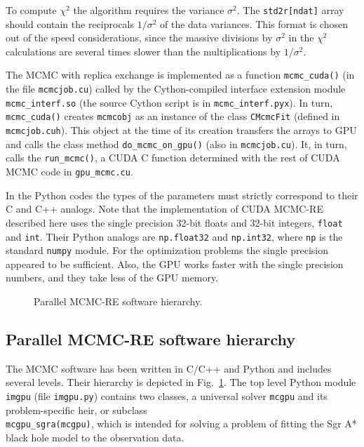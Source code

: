 \documentclass[preprint2]{aastex}
\begin{document}
To compute $\chi^2$ the algorithm requires the variance ${\sigma^2}$.
The \verb|std2r[ndat]| array should contain the reciprocals $1/\sigma^2$ 
of the data variances. This format is chosen out of the speed considerations,
since the massive divisions by $\sigma^2$ in the $\chi^2$ calculations are 
several times slower than the multiplications by $1/\sigma^2$. 

The MCMC with replica exchange is implemented as a function \verb|mcmc_cuda()|
(in the file \verb|mcmcjob.cu|) called by the Cython-compiled interface extension 
module \verb|mcmc_interf.so| (the source Cython script is in \verb|mcmc_interf.pyx|).
In turn, \verb|mcmc_cuda()| creates \verb|mcmcobj| as an instance of the class 
\verb|CMcmcFit| (defined in \verb|mcmcjob.cuh|). This object at the time of its creation
transfers the arrays to GPU and calls the class method \verb|do_mcmc_on_gpu()|
(also in \verb|mcmcjob.cu|). It, in turn, calls the \verb|run_mcmc()|, a CUDA C 
function determined with the rest of CUDA MCMC code in \verb|gpu_mcmc.cu|. 

In the Python codes the types of the parameters must strictly correspond to 
their  C and C++ analogs. Note that the implementation of CUDA MCMC-RE described
here uses the single precision 32-bit floats and 32-bit integers, \verb|float| 
and \verb|int|. Their Python analogs are \verb|np.float32| and \verb|np.int32|, 
where \verb|np| is the standard \verb|numpy| module. For the optimization problems 
the single precision appeared to be sufficient. Also, the GPU works faster with the 
single precision numbers, and they take less of the GPU memory.


\begin{figure}[ht!]    %
\caption{\small Parallel MCMC-RE software hierarchy.
\label{mcmc_soft_hierarchy}}
\end{figure}




\subsection{Parallel MCMC-RE software hierarchy}

The MCMC software has been written in C/C++ and Python and includes several levels. Their hierarchy is depicted in Fig.~\ref{mcmc_soft_hierarchy}. The top level Python module \verb|imgpu| (file \verb|imgpu.py|) contains two classes, a universal solver \verb|mcgpu| and its problem-specific heir, or subclass \\
\verb|mcgpu_sgra(mcgpu)|, which is intended for solving a problem of fitting the Sgr A* black hole model to the observation data. 
\end{document}
